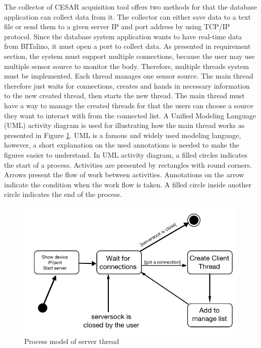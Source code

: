 The collector of CESAR acquisition tool offers two methods for that the database application can collect data from it. The collector can either save data to a text file or send them to a given server IP and port address by using TCP/IP protocol. Since the database system application wants to have real-time data from BITalino, it must open a port to collect data. As presented in requirement section, the system must support multiple connections, because the user may use multiple sensor source to monitor the body. Therefore, multiple threads system must be implemented. Each thread manages one sensor source. The main thread therefore just waits for connections, creates and hands in necessary information to the new created thread, then starts the new thread. The main thread must have a way to manage the created threads for that the users can choose a source they want to interact with from the connected list. A Unified Modeling Language (UML) activity diagram is used for illustrating how the main thread works as presented in Figure \ref{fig:Figures/ServerActivity}. UML is a famous and widely used modeling language, however, a short explanation on the used annotations is needed to make the figures easier to understand. In UML activity diagram, a filled circles indicates the start of a process. Activities are presented by rectangles with round corners. Arrows present the flow of work between activities. Annotations on the arrow indicate the condition when the work flow is taken. A filled circle inside another circle indicates the end of the process.\\
\begin{figure}[ht]
    \centering
    \includegraphics[width=1.0\textwidth]{Figures/ServerActivity.png}
    \caption{Process model of server thread}
    \label{fig:Figures/ServerActivity}
\end{figure}
